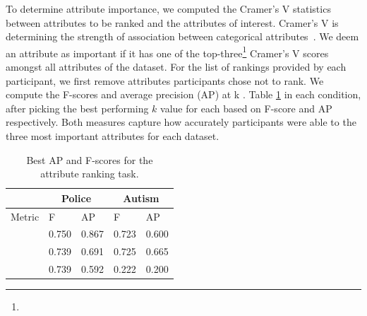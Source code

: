 To determine  attribute importance,
we computed the Cramer's V statistics
between attributes to be ranked
and the attributes of interest.
Cramer's V is 
determining
the strength of association between categorical attributes~\cite{McHugh2013}. We deem an attribute as important if it has one
of the top-three\footnote{} Cramer's V scores amongst all attributes of the dataset.
For the list of rankings provided by each participant,
we first remove attributes  participants chose not to rank.
We compute the F-scores and average precision (AP) at k
.
Table \ref{table:ranking_results}  in each condition, after picking the best performing $k$ value for each  based on F-score and AP respectively. Both measures capture how accurately participants were able to 
the three most important attributes for each dataset.
\begin{table}[ht!]
	\centering
	\vspace{-10pt}
	\begin{tabular}{lllll}
	         & \multicolumn{2}{c}{Police}                                   & \multicolumn{2}{c}{Autism}                                   \\ \hline
	Metric   & F                             & AP                            & F                             & AP                            \\ \hline
	\system  & \cellcolor{blue!25}0.750 & \cellcolor{blue!25}0.867 & 0.723                         & 0.600                         \\
	\cluster & 0.739                         & 0.691                         & \cellcolor{blue!25}0.725 & \cellcolor{blue!25}0.665 \\
	\BFS     & 0.739                         & 0.592                         & 0.222                         & 0.200                         \\
	\end{tabular}
	\caption{Best AP and F-scores for the attribute ranking task.}
	\label{table:ranking_results}
	\vspace{-20pt}
\end{table}
